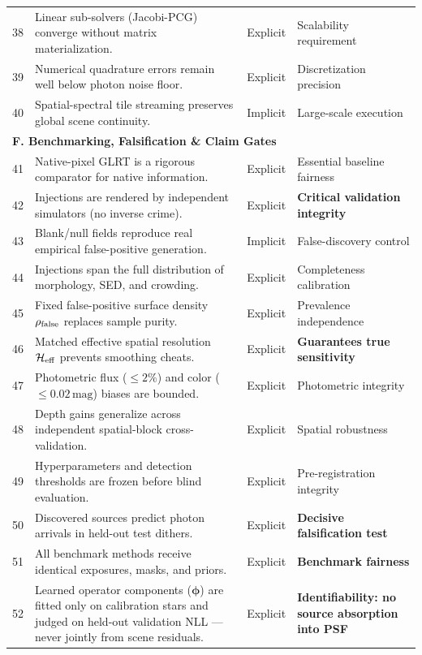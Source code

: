 \documentclass[11pt,a4paper]{article}
\begin{document}
\begin{longtable}{r p{8.2cm} c p{4.0cm}}
38 & Linear sub-solvers (Jacobi-PCG) converge without matrix materialization. & Explicit & Scalability requirement \\
39 & Numerical quadrature errors remain well below photon noise floor. & Explicit & Discretization precision \\
40 & Spatial-spectral tile streaming preserves global scene continuity. & Implicit & Large-scale execution \\
\midrule
\multicolumn{4}{l}{\textbf{F. Benchmarking, Falsification \& Claim Gates}} \\
41 & Native-pixel GLRT is a rigorous comparator for native information. & Explicit & Essential baseline fairness \\
42 & Injections are rendered by independent simulators (no inverse crime). & Explicit & \textbf{Critical validation integrity} \\
43 & Blank/null fields reproduce real empirical false-positive generation. & Implicit & False-discovery control \\
44 & Injections span the full distribution of morphology, SED, and crowding. & Explicit & Completeness calibration \\
45 & Fixed false-positive surface density $\rho_{\rm false}$ replaces sample purity. & Explicit & Prevalence independence \\
46 & Matched effective spatial resolution $\mathcal{H}_{\rm eff}$ prevents smoothing cheats. & Explicit & \textbf{Guarantees true sensitivity} \\
47 & Photometric flux ($\le 2\%$) and color ($\le 0.02\,\mathrm{mag}$) biases are bounded. & Explicit & Photometric integrity \\
48 & Depth gains generalize across independent spatial-block cross-validation. & Explicit & Spatial robustness \\
49 & Hyperparameters and detection thresholds are frozen before blind evaluation. & Explicit & Pre-registration integrity \\
50 & Discovered sources predict photon arrivals in held-out test dithers. & Explicit & \textbf{Decisive falsification test} \\
51 & All benchmark methods receive identical exposures, masks, and priors. & Explicit & \textbf{Benchmark fairness} \\
52 & Learned operator components ($\boldsymbol{\phi}$) are fitted only on calibration stars and judged on held-out validation NLL --- never jointly from scene residuals. & Explicit & \textbf{Identifiability: no source absorption into PSF} \\
\end{longtable}
\endgroup
\end{document}
